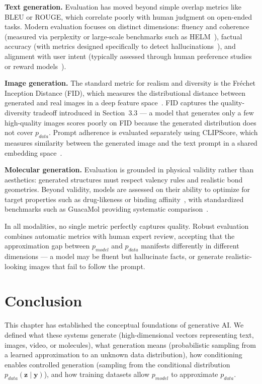 \documentclass{book}
\begin{document}
\textbf{Text generation.} Evaluation has moved beyond simple overlap metrics
like BLEU or ROUGE, which correlate poorly with human judgment on open-ended
tasks. Modern evaluation focuses on distinct dimensions: fluency and coherence
(measured via perplexity or large-scale benchmarks such as
HELM~\cite{liang2022helm}), factual accuracy (with metrics designed specifically
to detect hallucinations~\cite{lin2021truthfulqa}), and alignment with user
intent (typically assessed through human preference studies or reward
models~\cite{ouyang2022training}).

\textbf{Image generation.} The standard metric for realism and diversity is the
Fr\'{e}chet Inception Distance (FID), which measures the distributional
distance between generated and real images in a deep feature
space~\cite{heusel2017gans}. FID captures the quality-diversity tradeoff
introduced in Section~3.3 --- a model that generates only a few high-quality
images scores poorly on FID because the generated distribution does not cover
$p_{data}$. Prompt adherence is evaluated separately using CLIPScore, which
measures similarity between the generated image and the text prompt in a
shared embedding space~\cite{hessel2021clipscore}.

\textbf{Molecular generation.} Evaluation is grounded in physical validity
rather than aesthetics: generated structures must respect valency rules and
realistic bond geometries. Beyond validity, models are assessed on their ability
to optimize for target properties such as drug-likeness or binding
affinity~\cite{gomez2018automatic}, with standardized benchmarks such as
GuacaMol providing systematic comparison~\cite{brown2019guacamol}.

In all modalities, no single metric perfectly captures quality. Robust
evaluation combines automatic metrics with human expert review, accepting that
the approximation gap between $p_{model}$ and $p_{data}$ manifests differently
in different dimensions --- a model may be fluent but hallucinate facts, or
generate realistic-looking images that fail to follow the prompt.

\section{Conclusion}

This chapter has established the conceptual foundations of generative AI. We
defined what these systems generate (high-dimensional vectors representing text,
images, video, or molecules), what generation means (probabilistic sampling from
a learned approximation to an unknown data distribution), how conditioning
enables controlled generation (sampling from the conditional distribution
$p_{data}(\mathbf{z} \mid \mathbf{y})$), and how training datasets allow
$p_{model}$ to approximate $p_{data}$.
\end{document}
